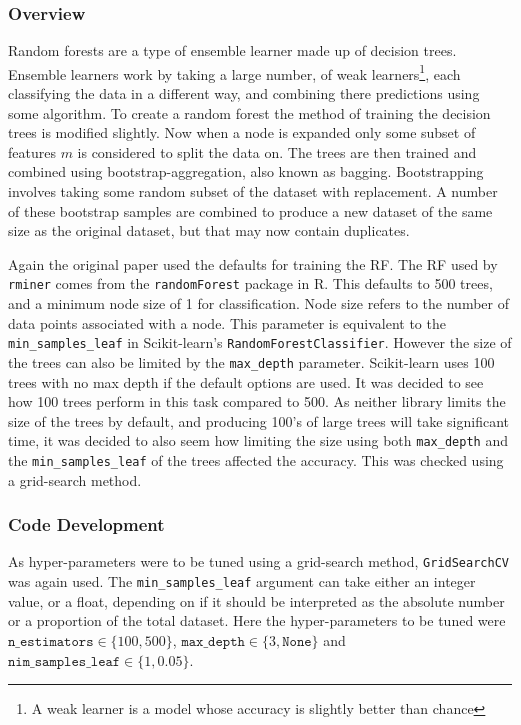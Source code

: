 \documentclass[12pt,a4paper,titlepage,twoside]{report}
\begin{document}
\subsubsection*{Overview}
	Random forests are a type of ensemble learner made up of decision trees. Ensemble learners work by taking a large number, of weak learners\footnote{A weak learner is a model whose accuracy is slightly better than chance}, each classifying the data in a different way, and combining there predictions using some algorithm\cite{ml-algorithmic-perspective}. To create a random forest the method of training the decision trees is modified slightly. Now when a node is expanded only some subset of features $m$ is considered to split the data on. The trees are then trained and combined using bootstrap-aggregation, also known as bagging. Bootstrapping involves taking some random subset of the dataset with replacement. A number of these bootstrap samples are combined to produce a new dataset of the same size as the original dataset, but that may now contain duplicates. \par
	Again the original paper used the defaults for training the RF. The RF used by \texttt{rminer} comes from the \texttt{randomForest} package in R. This defaults to 500 trees, and a minimum node size of 1 for classification. Node size refers to the number of data points associated with a node. This parameter is equivalent to the \texttt{min_samples_leaf} in Scikit-learn's \texttt{RandomForestClassifier}. However the size of the trees can also be limited by the \texttt{max_depth} parameter. Scikit-learn uses 100 trees with no max depth if the default options are used. It was decided to see how 100 trees perform in this task compared to 500. As neither library limits the size of the trees by default, and producing 100's of large trees will take significant time, it was decided to also seem how limiting the size using both \texttt{max_depth} and the \texttt{min_samples_leaf} of the trees affected the accuracy. This was checked using a grid-search method.
	
\subsubsection*{Code Development}
	As hyper-parameters were to be tuned using a grid-search method, \texttt{GridSearchCV} was again used. The \texttt{min_samples_leaf} argument can take either an integer value, or a float, depending on if it should be interpreted as the absolute number or a proportion of the total dataset. Here the hyper-parameters to be tuned were $\texttt{n_estimators} \in \{100, 500\}$, $\texttt{max_depth} \in \{3, \texttt{None}\}$ and $\texttt{nim_samples_leaf} \in \{1, 0.05\}$. 
	
\end{document}
